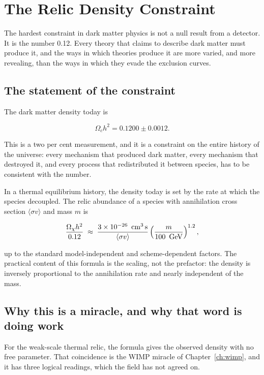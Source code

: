 
\chapter{The Relic Density Constraint}
\label{ch:relic}

The hardest constraint in dark matter physics is not a null result from a
detector. It is the number 0.12. Every theory that claims to describe dark
matter must produce it, and the ways in which theories produce it are more
varied, and more revealing, than the ways in which they evade the exclusion
curves.

\section{The statement of the constraint}The dark matter density today is

\[
\Omega_c h^2 = 0.1200 \pm 0.0012 .
\]

This is a two per cent measurement, and it is a constraint on the entire
history of the universe: every mechanism that produced dark matter, every
mechanism that destroyed it, and every process that redistributed it between
species, has to be consistent with the number.

In a thermal equilibrium history, the density today is set by the rate at
which the species decoupled. The relic abundance of a species with
annihilation cross section $\langle\sigma v\rangle$ and mass $m$ is

\[
\frac{\Omega_\chi h^2}{0.12} \;\approx\;
\frac{3\times 10^{-26}\ \,\mathrm{cm}^{3}\,\mathrm{s}}{\langle\sigma v\rangle}
\left(\frac{m}{100\ \,\mathrm{GeV}}\right)^{1.2},
\]

up to the standard model-independent and scheme-dependent factors. The
practical content of this formula is the scaling, not the prefactor: the
density is inversely proportional to the annihilation rate and nearly
independent of the mass.

\section{Why this is a miracle, and why that word is doing work}For the
weak-scale thermal relic, the formula gives the observed density with no free
parameter. That coincidence is the WIMP miracle of Chapter~\ref{ch:wimp}, and
it has three logical readings, which the field has not agreed on.

